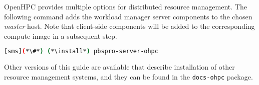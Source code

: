 OpenHPC provides multiple options for distributed resource management. The 
following command adds the \rms{} workload manager server components to the
chosen {\em master} host. Note that client-side components will be added to
the corresponding compute image in a subsequent step.

\begin{lstlisting}[language=bash,keywords={}]
[sms](*\#*) (*\install*) pbspro-server-ohpc
\end{lstlisting}

Other versions of this guide are available that describe installation of other
resource management systems, and they can be found in the \texttt{docs-ohpc}
package.
